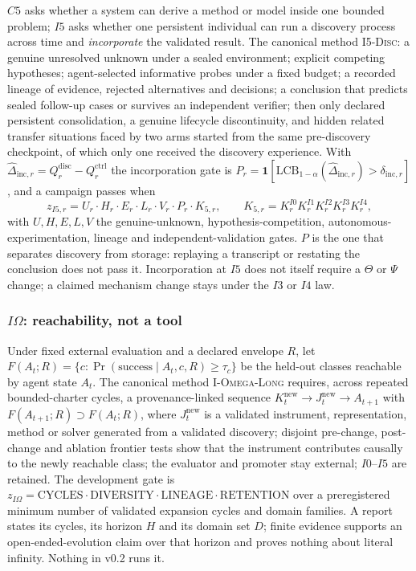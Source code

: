 $C5$ asks whether a system can derive a method or model inside one bounded problem; $I5$ asks whether one persistent individual can run a discovery process across time and \emph{incorporate} the validated result. The canonical method \textsc{I5-Disc}: a genuine unresolved unknown under a sealed environment; explicit competing hypotheses; agent-selected informative probes under a fixed budget; a recorded lineage of evidence, rejected alternatives and decisions; a conclusion that predicts sealed follow-up cases or survives an independent verifier; then only declared persistent consolidation, a genuine lifecycle discontinuity, and hidden related transfer situations faced by two arms started from the same pre-discovery checkpoint, of which only one received the discovery experience. With $\hat\Delta_{\mathrm{inc},r} = Q^{\mathrm{disc}}_r - Q^{\mathrm{ctrl}}_r$ the incorporation gate is $P_r = \mathbf 1[\mathrm{LCB}_{1-\alpha}(\hat\Delta_{\mathrm{inc},r}) > \delta_{\mathrm{inc},r}]$, and a campaign passes when
\[
z_{I5,r} = U_r \cdot H_r \cdot E_r \cdot L_r \cdot V_r \cdot P_r \cdot K_{5,r}, \qquad K_{5,r} = K^{I0}_r K^{I1}_r K^{I2}_r K^{I3}_r K^{I4}_r,
\]
with $U, H, E, L, V$ the genuine-unknown, hypothesis-competition, autonomous-experimentation, lineage and independent-validation gates. $P$ is the one that separates discovery from storage: replaying a transcript or restating the conclusion does not pass it. Incorporation at $I5$ does not itself require a $\Theta$ or $\Psi$ change; a claimed mechanism change stays under the $I3$ or $I4$ law.

\subsubsection{$I\Omega$: reachability, not a tool}\label{sec:iomega}

Under fixed external evaluation and a declared envelope $R$, let $F(A_t; R) = \{c : \Pr(\text{success} \mid A_t, c, R) \ge \tau_c\}$ be the held-out classes reachable by agent state $A_t$. The canonical method \textsc{I-Omega-Long} requires, across repeated bounded-charter cycles, a provenance-linked sequence $K^{\mathrm{new}}_t \to J^{\mathrm{new}}_t \to A_{t+1}$ with $F(A_{t+1}; R) \supset F(A_t; R)$, where $J^{\mathrm{new}}_t$ is a validated instrument, representation, method or solver generated from a validated discovery; disjoint pre-change, post-change and ablation frontier tests show that the instrument contributes causally to the newly reachable class; the evaluator and promoter stay external; $I0$--$I5$ are retained. The development gate is $z_{I\Omega} = \mathrm{CYCLES} \cdot \mathrm{DIVERSITY} \cdot \mathrm{LINEAGE} \cdot \mathrm{RETENTION}$ over a preregistered minimum number of validated expansion cycles and domain families. A report states its cycles, its horizon $H$ and its domain set $D$; finite evidence supports an open-ended-evolution claim over that horizon and proves nothing about literal infinity. Nothing in v0.2 runs it.


